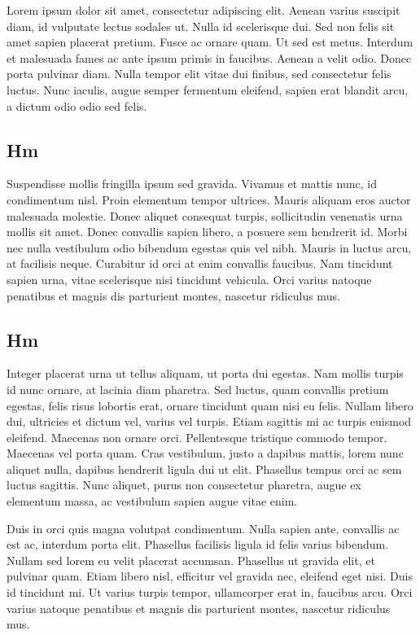 \documentclass{article}
\begin{document}
    \tableofcontents


Lorem ipsum dolor sit amet, consectetur adipiscing elit. Aenean varius suscipit diam, id vulputate lectus sodales ut. Nulla id scelerisque dui. Sed non felis sit amet sapien placerat pretium. Fusce ac ornare quam. Ut sed est metus. Interdum et malesuada fames ac ante ipsum primis in faucibus. Aenean a velit odio. Donec porta pulvinar diam. Nulla tempor elit vitae dui finibus, sed consectetur felis luctus. Nunc iaculis, augue semper fermentum eleifend, sapien erat blandit arcu, a dictum odio odio sed felis.
\subsection{Hm}
Suspendisse mollis fringilla ipsum sed gravida. Vivamus et mattis nunc, id condimentum nisl. Proin elementum tempor ultrices. Mauris aliquam eros auctor malesuada molestie. Donec aliquet consequat turpis, sollicitudin venenatis urna mollis sit amet. Donec convallis sapien libero, a posuere sem hendrerit id. Morbi nec nulla vestibulum odio bibendum egestas quis vel nibh. Mauris in luctus arcu, at facilisis neque. Curabitur id orci at enim convallis faucibus. Nam tincidunt sapien urna, vitae scelerisque nisi tincidunt vehicula. Orci varius natoque penatibus et magnis dis parturient montes, nascetur ridiculus mus.
\subsection{Hm}
Integer placerat urna ut tellus aliquam, ut porta dui egestas. Nam mollis turpis id nunc ornare, at lacinia diam pharetra. Sed luctus, quam convallis pretium egestas, felis risus lobortis erat, ornare tincidunt quam nisi eu felis. Nullam libero dui, ultricies et dictum vel, varius vel turpis. Etiam sagittis mi ac turpis euismod eleifend. Maecenas non ornare orci. Pellentesque tristique commodo tempor. Maecenas vel porta quam. Cras vestibulum, justo a dapibus mattis, lorem nunc aliquet nulla, dapibus hendrerit ligula dui ut elit. Phasellus tempus orci ac sem luctus sagittis. Nunc aliquet, purus non consectetur pharetra, augue ex elementum massa, ac vestibulum sapien augue vitae enim.

Duis in orci quis magna volutpat condimentum. Nulla sapien ante, convallis ac est ac, interdum porta elit. Phasellus facilisis ligula id felis varius bibendum. Nullam sed lorem eu velit placerat accumsan. Phasellus ut gravida elit, et pulvinar quam. Etiam libero nisl, efficitur vel gravida nec, eleifend eget nisi. Duis id tincidunt mi. Ut varius turpis tempor, ullamcorper erat in, faucibus arcu. Orci varius natoque penatibus et magnis dis parturient montes, nascetur ridiculus mus.
\end{document}
